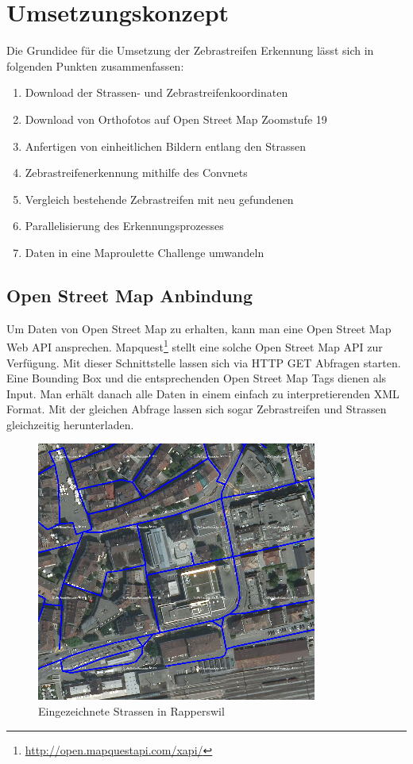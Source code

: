 \section{Umsetzungskonzept}
Die Grundidee für die Umsetzung der Zebrastreifen Erkennung lässt sich in folgenden Punkten zusammenfassen:
\begin{enumerate}
	\item Download der Strassen- und Zebrastreifenkoordinaten
	\item Download von Orthofotos auf Open Street Map Zoomstufe 19
	\item Anfertigen von einheitlichen Bildern entlang den Strassen
	\item Zebrastreifenerkennung mithilfe des Convnets
	\item Vergleich bestehende Zebrastreifen mit neu gefundenen
	\item Parallelisierung des Erkennungsprozesses
	\item Daten in eine Maproulette Challenge umwandeln
\end{enumerate}

\subsection{Open Street Map Anbindung}
Um Daten von Open Street Map zu erhalten, kann man eine Open Street Map Web API ansprechen. Mapquest\footnote{\url{http://open.mapquestapi.com/xapi/}} stellt eine solche Open Street Map API zur Verfügung. Mit dieser Schnittstelle lassen sich via HTTP GET Abfragen starten. Eine Bounding Box und die entsprechenden Open Street Map Tags dienen als Input. Man erhält danach alle Daten in einem einfach zu interpretierenden XML Format. Mit der gleichen Abfrage lassen sich sogar Zebrastreifen und Strassen gleichzeitig herunterladen.

\begin{figure}[H]
	\centering
	\includegraphics{images/Strassen_Rapperswil.png}
	\caption{Eingezeichnete Strassen in Rapperswil}
\end{figure}


